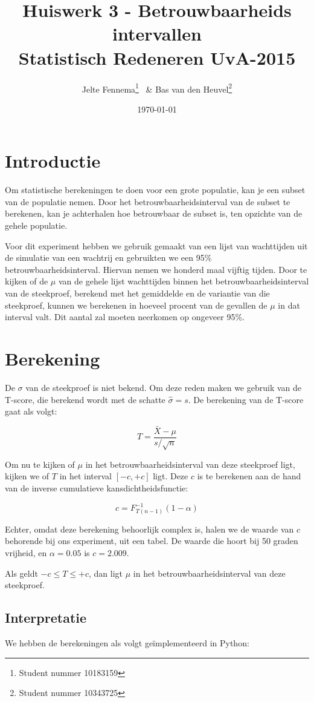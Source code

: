 \documentclass{article}
\title{Huiswerk 3 - Betrouwbaarheids intervallen\\ \large{Statistisch Redeneren UvA-2015}}
\author{Jelte Fennema\thanks{Student nummer 10183159} ~\& Bas van den
Heuvel\thanks{Student nummer 10343725}}
\date{\today}
\begin{document}
\maketitle

\section{Introductie}
Om statistische berekeningen te doen voor een grote populatie, kan je een subset
van de populatie nemen. Door het betrouwbaarheidsinterval van de subset te
berekenen, kan je achterhalen hoe betrouwbaar de subset is, ten opzichte van de
gehele populatie.

Voor dit experiment hebben we gebruik gemaakt van een lijst van wachttijden uit
de simulatie van een wachtrij en gebruikten we een 95\%
betrouwbaarheidsinterval. Hiervan nemen we honderd maal vijftig tijden.  Door te
kijken of de $\mu$ van de gehele lijst wachttijden binnen het
betrouwbaarheidsinterval van de steekproef, berekend met het gemiddelde en de
variantie van die steekproef, kunnen we berekenen in hoeveel procent van de
gevallen de $\mu$ in dat interval valt. Dit aantal zal moeten neerkomen op
ongeveer 95\%.

\section{Berekening}

De $\sigma$ van de steekproef is niet bekend. Om deze reden maken we gebruik van
de T-score, die berekend wordt met de schatte $\hat\sigma = s$. De berekening
van de T-score gaat als volgt:

$$ T = \frac{\bar{X} - \mu}{s / \sqrt{n}} $$

Om nu te kijken of $\mu$ in het betrouwbaarheidsinterval van deze steekproef
ligt, kijken we of $T$ in het interval $[-c,+c]$ ligt. Deze $c$ is te berekenen
aan de hand van de inverse cumulatieve kansdichtheidsfunctie:

$$ c = F^{-1}_{T(n-1)} (1-\alpha) $$

Echter, omdat deze berekening behoorlijk complex is, halen we de waarde van $c$
behorende bij ons experiment, uit een tabel. De waarde die hoort bij 50 graden
vrijheid, en $\alpha=0.05$ is $c=2.009$.

Als geldt $-c \leq T \leq +c$, dan ligt $\mu$ in het betrouwbaarheidsinterval
van deze steekproef.

\subsection{Interpretatie}
We hebben de berekeningen als volgt geïmplementeerd in Python:
\end{document}
